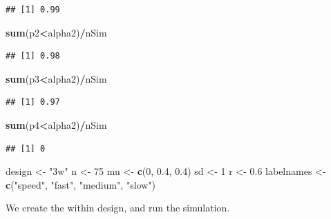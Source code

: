 \documentclass[]{book}
\newenvironment{Shaded}{\begin{snugshade}}{\end{snugshade}}
\newcommand{\DecValTok}[1]{\textcolor[rgb]{0.00,0.00,0.81}{#1}}
\newcommand{\FloatTok}[1]{\textcolor[rgb]{0.00,0.00,0.81}{#1}}
\newcommand{\KeywordTok}[1]{\textcolor[rgb]{0.13,0.29,0.53}{\textbf{#1}}}
\newcommand{\NormalTok}[1]{#1}
\newcommand{\OperatorTok}[1]{\textcolor[rgb]{0.81,0.36,0.00}{\textbf{#1}}}
\newcommand{\StringTok}[1]{\textcolor[rgb]{0.31,0.60,0.02}{#1}}
\begin{document}
\begin{verbatim}
## [1] 0.99
\end{verbatim}

\begin{Shaded}
\begin{Highlighting}[]
\KeywordTok{sum}\NormalTok{(p2}\OperatorTok{<}\NormalTok{alpha2)}\OperatorTok{/}\NormalTok{nSim}
\end{Highlighting}
\end{Shaded}

\begin{verbatim}
## [1] 0.98
\end{verbatim}

\begin{Shaded}
\begin{Highlighting}[]
\KeywordTok{sum}\NormalTok{(p3}\OperatorTok{<}\NormalTok{alpha2)}\OperatorTok{/}\NormalTok{nSim}
\end{Highlighting}
\end{Shaded}

\begin{verbatim}
## [1] 0.97
\end{verbatim}

\begin{Shaded}
\begin{Highlighting}[]
\KeywordTok{sum}\NormalTok{(p4}\OperatorTok{<}\NormalTok{alpha2)}\OperatorTok{/}\NormalTok{nSim}
\end{Highlighting}
\end{Shaded}

\begin{verbatim}
## [1] 0
\end{verbatim}

\begin{Shaded}
\begin{Highlighting}[]
\NormalTok{design <-}\StringTok{ "3w"}
\NormalTok{n <-}\StringTok{ }\DecValTok{75}
\NormalTok{mu <-}\StringTok{ }\KeywordTok{c}\NormalTok{(}\DecValTok{0}\NormalTok{, }\FloatTok{0.4}\NormalTok{, }\FloatTok{0.4}\NormalTok{)}
\NormalTok{sd <-}\StringTok{ }\DecValTok{1}
\NormalTok{r <-}\StringTok{ }\FloatTok{0.6}
\NormalTok{labelnames <-}\StringTok{ }\KeywordTok{c}\NormalTok{(}\StringTok{"speed"}\NormalTok{, }\StringTok{"fast"}\NormalTok{, }\StringTok{"medium"}\NormalTok{, }\StringTok{"slow"}\NormalTok{)}
\end{Highlighting}
\end{Shaded}

We create the within design, and run the simulation.
\end{document}
